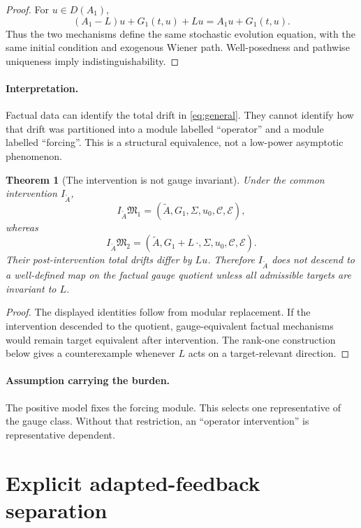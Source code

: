 \documentclass[11pt]{article}
\newtheorem{theorem}[assumption]{Theorem}
\theoremstyle{remark}
\newcommand{\cC}{\mathcal C}
\newcommand{\cM}{\mathfrak M}
\begin{document}
\begin{proof}
For $u\in D(A_1)$,
\[
 (A_1-L)u+G_1(t,u)+Lu
 =
 A_1u+G_1(t,u).
\]
Thus the two mechanisms define the same stochastic evolution equation, with the same initial condition and exogenous Wiener path. Well-posedness and pathwise uniqueness imply indistinguishability.
\end{proof}

\paragraph{Interpretation.}
Factual data can identify the total drift in \eqref{eq:general}. They cannot identify how that drift was partitioned into a module labelled ``operator'' and a module labelled ``forcing''. This is a structural equivalence, not a low-power asymptotic phenomenon.

\begin{theorem}[The intervention is not gauge invariant]\label{thm:not-descend}
Under the common intervention $I_{\widetilde A}$,
\[
 I_{\widetilde A}\cM_1
 =
 (\widetilde A,G_1,\Sigma,u_0,\cC,\mathcal E),
\]
whereas
\[
 I_{\widetilde A}\cM_2
 =
 (\widetilde A,G_1+L\,\cdot,\Sigma,u_0,\cC,\mathcal E).
\]
Their post-intervention total drifts differ by $Lu$. Therefore $I_{\widetilde A}$ does not descend to a well-defined map on the factual gauge quotient unless all admissible targets are invariant to $L$.
\end{theorem}

\begin{proof}
The displayed identities follow from modular replacement. If the intervention descended to the quotient, gauge-equivalent factual mechanisms would remain target equivalent after intervention. The rank-one construction below gives a counterexample whenever $L$ acts on a target-relevant direction.
\end{proof}

\paragraph{Assumption carrying the burden.}
The positive model fixes the forcing module. This selects one representative of the gauge class. Without that restriction, an ``operator intervention'' is representative dependent.

\section{Explicit adapted-feedback separation}
\end{document}
